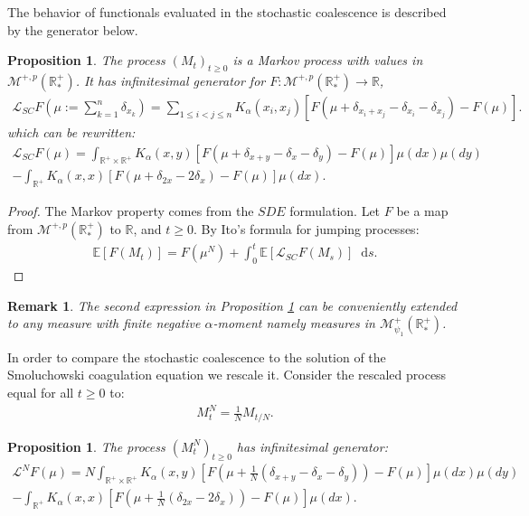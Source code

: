 \documentclass[11pt,a4paper]{article}
\newcommand{\RR}{\mathbb{R}}
\newcommand{\RRP}{\mathbb{R}^+_*}
\newcommand{\MC}{\mathcal{M}}
\newcommand{\LC}{\mathcal{L}}
\newcommand{\E}[1]{\mathbb{E}\left[#1\right]}
\newcommand{\Proc}[1]{\left(#1\right)_{t\geq 0}}
\newcommand{\dd}{\mathop{}\!\mathrm{d}}
\newtheorem{remark}[theorem]{Remark}
\newtheorem{proposition}[theorem]{Proposition}
\begin{document}
The behavior of functionals evaluated in the stochastic coalescence is described by the generator below.
\begin{proposition}\label{prop:gen-SC}
    The process $\Proc{M_t}$  is a Markov process with values in $\MC^{+,p}(\RRP)$. It has infinitesimal generator for $F : \MC^{+,p}(\RRP) \to \RR$,
    \begin{align*}
        \LC_{SC} F\left(\mu := \sum\limits_{k = 1}^n\delta_{x_k} \right) = \sum\limits_{1\le i <j \le n} K_{\alpha}(x_i,x_j) \left[F\left(\mu + \delta_{x_i + x_j} - \delta_{x_i} -\delta_{x_j}\right) - F(\mu)\right].
    \end{align*}
    which can be rewritten:
    \begin{multline*}
        \LC_{SC} F(\mu) = \int_{\RR^+ \times \RR^+} K_{\alpha}(x,y)\left[ F\left(\mu + \delta_{x+y} - \delta_x - \delta_y \right) - F(\mu) \right]\mu(dx)\mu(dy) \\
        -\int_{\RR^+} K_{\alpha}(x,x)\left[ F\left(\mu + \delta_{2x} - 2\delta_x \right) - F(\mu) \right]\mu(dx).
    \end{multline*}
\end{proposition}
\begin{proof}
    The Markov property comes from the $SDE$ formulation. Let $F$ be a map from $\MC^{+,p}(\RRP)$ to $\RR$, and $t \geq 0$. By Ito's formula for jumping processes:
    \begin{align*}
        \E{F(M_t)} = F(\mu^N) + \int_0^t \E{\LC_{SC} F\left(M_s\right)} \dd s.
    \end{align*}
\end{proof}
\begin{remark}
    The second expression in Proposition \ref{prop:gen-SC} can be conveniently extended to any measure with finite negative $\alpha$-moment namely measures in $\MC_{\psi_1}^+(\RRP)$.
\end{remark}
In order to compare the stochastic coalescence to the solution of the Smoluchowski coagulation equation we rescale it. Consider the rescaled process equal for all $t \geq 0$ to:
\begin{align*}
    M^N_t = \frac{1}{N} M_{t/N}.
\end{align*}
\begin{proposition}
    The process $\Proc{M^N_{t}}$ has infinitesimal generator:
    \begin{multline*}
        \LC^N F(\mu) = N\int_{\RR^+ \times \RR^+} K_{\alpha}(x,y)\left[ F\left(\mu + \frac{1}{N}\left(\delta_{x+y} - \delta_x - \delta_y\right) \right) - F(\mu) \right]\mu(dx)\mu(dy) \\
        -\int_{\RR^+} K_{\alpha}(x,x)\left[ F\left(\mu + \frac{1}{N}\left(\delta_{2x} - 2\delta_x\right) \right) - F(\mu) \right]\mu(dx).
    \end{multline*}
\end{proposition}
\end{document}
